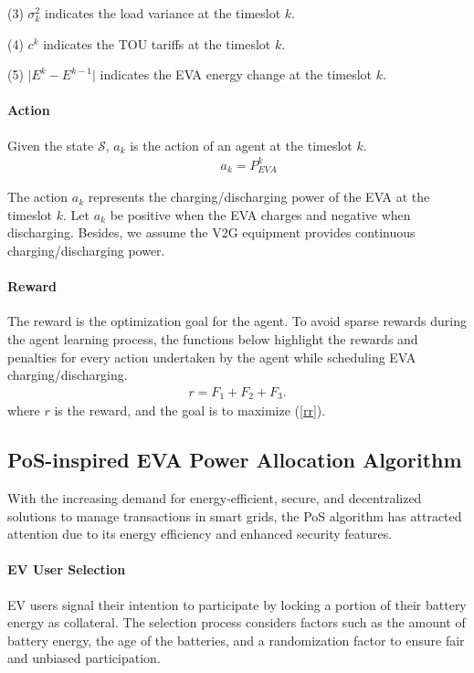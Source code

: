 \documentclass[journal,twoside]{IEEEtran}
\begin{document}
(3) ${\sigma^{2}_k}$ indicates the load variance at the timeslot $k$.

(4) $c^k$ indicates the TOU tariffs at the timeslot $k$.

(5) ${\lvert E^k-E^{k-1} \rvert}$ indicates the EVA energy change at the timeslot $k$.

\paragraph{Action}

Given the state $\mathcal{S}$, $a_{k}$ is the action of an agent at the timeslot $k$.
\begin{align}\label{action}
&\quad a_{k}=P_{EVA}^{k}
\end{align}

The action $a_{k}$ represents the charging/discharging power of the EVA at the timeslot $k$. Let $a_{k}$ be positive when the EVA charges and negative when discharging. Besides, we assume the V2G equipment provides continuous charging/discharging power.

\paragraph{Reward}
The reward is the optimization goal for the agent. To avoid sparse rewards during the agent learning process, the functions below highlight the rewards and penalties for every action undertaken by the agent while scheduling EVA charging/discharging.
\begin{align}
r=F_1+ F_2+ F_3.\label{rr}
\end{align}
where $r$ is the reward, and the goal is to maximize (\ref{rr}).


\subsection{PoS-inspired EVA Power Allocation Algorithm}

With the increasing demand for energy-efficient, secure, and decentralized solutions to manage transactions in smart grids, the PoS algorithm has attracted attention due to its energy efficiency and enhanced security features.

\paragraph{EV User Selection} EV users signal their intention to participate by locking a portion of their battery energy as collateral. The selection process considers factors such as the amount of battery energy, the age of the batteries, and a randomization factor to ensure fair and unbiased participation.
\end{document}
